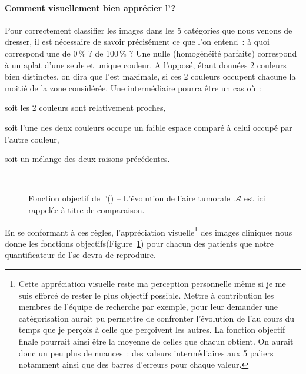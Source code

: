 \documentclass[main.tex]{subfiles}
\begin{document}
\paragraph{Comment visuellement bien apprécier l'\hetero ?}
Pour correctement classifier les images dans les 5 catégories que nous venons de dresser, il est nécessaire de savoir précisément ce que l'on entend~: à quoi correspond une \hetero de 0\,\% ? de 100\,\% ? Une \hetero nulle (\ie homogénéité parfaite) correspond à un aplat d'une seule et unique couleur. A l'opposé, étant données 2 couleurs bien distinctes, on dira que l'\hetero est maximale, si  ces 2 couleurs occupent chacune la moitié de la zone considérée. Une \hetero intermédiaire pourra être un cas où~:
\begin{myitemize}
\item soit les 2 couleurs sont relativement proches,
\item soit l'une des deux couleurs occupe un faible espace comparé à celui occupé par l'autre couleur, 
\item soit un mélange des deux raisons précédentes.
\end{myitemize}~
\begin{figure}
\caption{\label{fig:hetero_visuelle}Fonction objectif de l'\hetero (\!\!\HHobj) -- L'évolution de l'aire tumorale~$\mathcal{A}$ est ici rappelée à titre de comparaison.}
\end{figure}


En se conformant à ces règles, l'appréciation visuelle\footnote{\samepage Cette appréciation visuelle reste ma perception personnelle même si je me suis efforcé de rester le plus objectif possible. Mettre à contribution les membres de l'équipe de recherche par exemple, pour leur demander une catégorisation aurait pu permettre de confronter l'évolution de l'\hetero au cours du temps que je perçois à celle que perçoivent les autres. La fonction objectif finale pourrait ainsi être la moyenne de celles que chacun obtient. On aurait donc un peu plus de nuances~: des valeurs intermédiaires aux 5 paliers notamment ainsi que des barres d'erreurs pour chaque valeur.}
 des images cliniques nous donne les fonctions objectifs\HHobj (\cf Figure~\ref{fig:hetero_visuelle}) pour chacun des patients que notre quantificateur de l'\hetero se devra de reproduire. 
 
\end{document}
